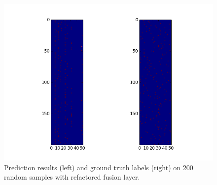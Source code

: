 \begin{figure}[htbp]
	\centering
	\includegraphics[width=\textwidth]{img/prediction_refactored.png}
	\caption{Prediction results (left) and ground truth labels (right) on 200 random samples with refactored fusion layer.}
	\label{fig:prediction_refactored}
\end{figure}